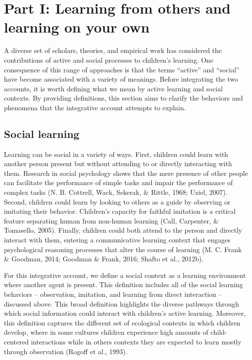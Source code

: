 \documentclass[oneside]{report}
\begin{document}
\hypertarget{scope}{\section{Part I: Learning from others and learning
on your own}\label{scope}}

A diverse set of scholars, theories, and empirical work has considered
the contributions of active and social processes to children's learning.
One consequence of this range of approaches is that the terms ``active''
and ``social'' have become associated with a variety of meanings. Before
integrating the two accounts, it is worth defining what we mean by
active learning and social contexts. By providing definitions, this
section aims to clarify the behaviors and phenomena that the integrative
account attempts to explain.

\subsection{Social learning}\label{social-learning}

Learning can be social in a variety of ways. First, children could learn
with another person present but without attending to or directly
interacting with them. Research in social psychology shows that the mere
presence of other people can facilitate the performance of simple tasks
and impair the performance of complex tasks (N. B. Cottrell, Wack,
Sekerak, \& Rittle, 1968; Uziel, 2007). Second, children could learn by
looking to others as a guide by observing or imitating their behavior.
Children's capacity for faithful imitation is a critical feature
separating human from non-human learning (Call, Carpenter, \& Tomasello,
2005). Finally, children could both attend to the person and directly
interact with them, entering a communicative learning context that
engages psychological reasoning processes that alter the course of
learning (M. C. Frank \& Goodman, 2014; Goodman \& Frank, 2016; Shafto
et al., 2012b).

For this integrative account, we define a social context as a learning
environment where another agent is present. This definition includes all
of the social learning behaviors -- observation, imitation, and learning
from direct interaction -- discussed above. This broad definition
highlights the diverse pathways through which social information could
interact with children's active learning. Moreover, this definition
captures the different set of ecological contexts in which children
develop, where in some cultures children experience high amounts of
child-centered interactions while in others contexts they are expected
to learn mostly through observation (Rogoff et al., 1993).
\end{document}
